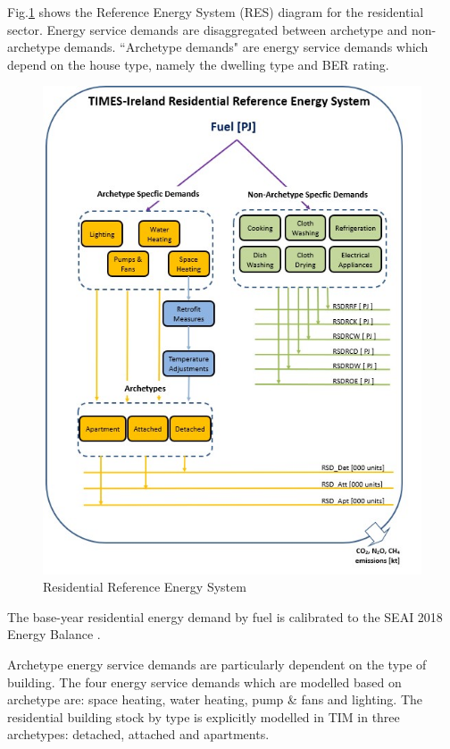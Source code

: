 \documentclass[journal abbreviation, manuscript]{copernicus}
\begin{document}
Fig.\ref{fig:TIM_RES} shows the Reference Energy System (RES) diagram for the residential sector. Energy service demands are disaggregated between archetype and non-archetype demands. ``Archetype demands" are energy service demands which depend on the house type, namely the dwelling type and BER rating. 
 
\begin{figure}[hb!]
 \centering
 \includegraphics[scale=3.2]{TIM_Residential_RES2.jpg} 
 \caption{Residential Reference Energy System}
 \label{fig:TIM_RES}
\end{figure}

The base-year residential energy demand by fuel is calibrated to the SEAI 2018 Energy Balance \cite{SEAI2019}.

Archetype energy service demands are particularly dependent on the type of building. The four energy service demands which are modelled based on archetype are: space heating, water heating, pump \& fans and lighting. The residential building stock by type is explicitly modelled in TIM in three archetypes: detached, attached and apartments. 
\end{document}
